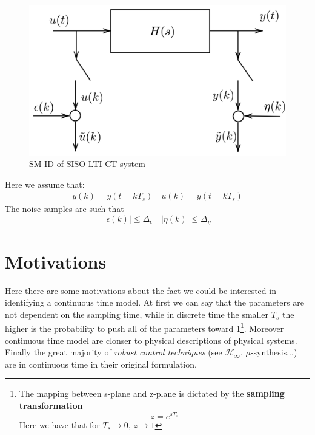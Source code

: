 \begin{multicols}{2}
    \begin{figure}[H]
        \centering 
        \includegraphics[scale=0.25]{img/CT_SM.png}
        \caption{SM-ID of SISO LTI CT system}
        \label{fig:CT_setup}
    \end{figure}
    Here we assume that:
    \begin{align*}
        y(k)=y(t=kT_s) \quad
        u(k)=y(t=k{T_s})
    \end{align*}
    The noise samples are such that 
    \begin{equation*}
        \vert \epsilon(k) \vert \le \Delta_\epsilon \quad
        \vert \eta(k) \vert \le \Delta_\eta
    \end{equation*}
\end{multicols}

\section{Motivations}
Here there are some motivations about the fact we could be interested in identifying a continuous time model. At first we can say that the parameters are not dependent on the sampling time, while in discrete time the smaller $T_s$ the higher is the probability to push all of the parameters toward 1\footnote{
    The mapping between s-plane and z-plane is dictated by the \textbf{sampling transformation}
    \begin{equation}
        z=e^{s{T_s}}
    \end{equation}  
    Here we have that for $T_s\to{0}$, $z\to1$
}. Moreover continuous time model are clonser to physical descriptions of physical systems. Finally the great majority of \textit{robust control techniques} (see $\mathcal{H}_\infty$, $\mu$-synthesis...) are in continuous time in their original formulation.

